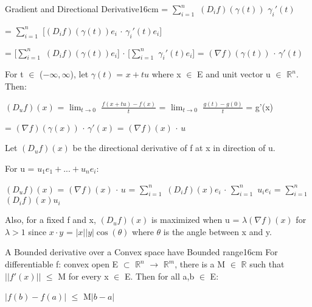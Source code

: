\begin{definition}{Gradient and Directional Derivative}{16cm}
        \hspace{2.15cm}
        = $\sum_{i=1}^n$ $(D_if)(\gamma(t))$ $\gamma_i'(t)$

        \hspace{2.15cm}
        = $\sum_{i=1}^n$ [$(D_if)(\gamma(t))e_i$ $\cdot$ $\gamma_i'(t)e_i$]

        \hspace{2.15cm}
        = [$\sum_{i=1}^n$ $(D_if)(\gamma(t))e_i$]
        $\cdot$ [$\sum_{i=1}^n$ $\gamma_i'(t)e_i$]
        = $(\nabla f)(\gamma(t))$ $\cdot$ $\gamma'(t)$

        For t $\in$ ($-\infty,\infty$), let $\gamma(t)$ = $x + tu$
        where x $\in$ E and unit vector u $\in$ $\mathbb{R}^n$. Then:

        \hspace{0.5cm}
        $(D_uf)(x)$
        = $\lim_{t \rightarrow 0}$ $\frac{f(x+tu) - f(x)}{t}$
        = $\lim_{t \rightarrow 0}$ $\frac{g(t) - g(0)}{t}$
        = g'(x)

        \hspace{2.3cm}
        = $(\nabla f)(\gamma(x))$ $\cdot$ $\gamma'(x)$
        = $(\nabla f)(x)$ $\cdot$ $u$

        Let $(D_uf)(x)$ be the {\color{lblue} directional derivative}
        of f at x in direction of u.

        For u = $u_1e_1 + ... + u_ne_i$:

        \hspace{0.5cm}
        $(D_uf)(x)$
        = $(\nabla f)(x)$ $\cdot$ $u$
        = $\sum_{i=1}^n$ $(D_if)(x)e_i$ $\cdot$ $\sum_{i=1}^n$ $u_ie_i$
        = $\sum_{i=1}^n$ $(D_if)(x)u_i$

        \vspace{0.3cm}

        Also, for a fixed f and x, $(D_uf)(x)$ is maximized when
        u = $\lambda (\nabla f)(x)$ for $\lambda > 1$
        since $x \cdot y$ = $|x| |y| \cos(\theta)$ where $\theta$ is the angle
        between x and y.
    \end{definition}

    \newpage



    \begin{wtheorem}{A Bounded derivative over a Convex space
    have Bounded range}{16cm}
        For differentiable f: convex open E $\subset$ $\mathbb{R}^n$
        $\rightarrow$ $\mathbb{R}^m$, there is a M $\in$ $\mathbb{R}$ such that
        $||f'(x)||$ $\leq$ M for every x $\in$ E. Then for all a,b $\in$ E:
        
        \hspace{0.5cm}
        $|f(b) - f(a)|$ $\leq$ M$|b-a|$
    \end{wtheorem}

